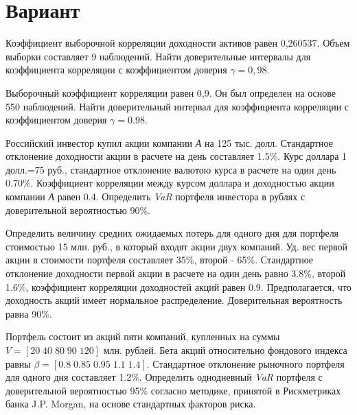 \documentclass[12pt,a4paper]{article}
\begin{document}
\pagebreak
\section{Вариант}
\begin{taskrus}
Коэффициент выборочной корреляции доходности активов равен 0,260537. Объем выборки составляет 9 наблюдений. Найти доверительные интервалы для коэффициента корреляции с коэффициентом доверия $\gamma=0,98$. 
\end{taskrus}

\begin{taskrus}
Выборочный коэффициент корреляции равен 0,9. Он был определен на основе 550 наблюдений. Найти доверительный интервал для коэффициента корреляции с коэффициентом доверия $\gamma=0.98$.
\end{taskrus}

\begin{taskrus}
Российский инвестор купил акции компании \textit{А} на 125 тыс. долл. Стандартное отклонение доходности акции в расчете на день составляет 1.5\%. Курс доллара 1 долл.=75 руб., стандартное отклонение валютою курса в расчете на один день 0.70\%. Коэффициент корреляции между курсом доллара и доходностью акции компании \textit{А} равен 0.4. Определить \textit{VaR }портфеля инвестора в рублях с доверительной вероятностью 90\%.
\end{taskrus}

\begin{taskrus} 
Определить величину средних ожидаемых потерь для одного дня для портфеля стоимостью 15 млн. руб., в который входят акции двух компаний. Уд. вес первой акции в стоимости портфеля составляет 35\%, второй - 65\%. Стандартное отклонение доходности первой акции в расчете на один день равно 3.8\%, второй 1.6\%, коэффициент корреляции доходностей акций равен 0.9. Предполагается, что доходность акций имеет нормальное распределение. Доверительная вероятность равна 90\%.

\end{taskrus}


\begin{taskrus}
Портфель состоит из акций пяти компаний, купленных на суммы   \newline $V=[20\;40\;80\;90\;120]$ млн. рублей. Бета акций относительно фондового индекса равны \newline $\beta=[0.8\;0.85\;0.95\;1.1\;1.4]$. Стандартное отклонение рыночного портфеля для одного дня составляет 1.2\%. Определить однодневный  \textit{VaR }портфеля с доверительной вероятностью 95\% согласно методике, принятой в Рискметриках банка J.P. Morgan, на основе стандартных факторов риска. 
\end{taskrus}
\end{document}
